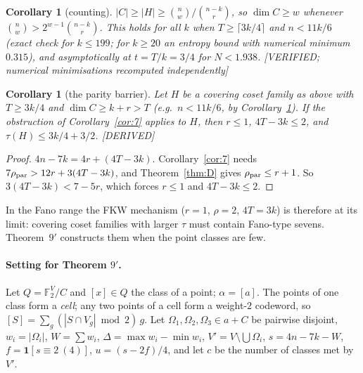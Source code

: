 \documentclass[11pt]{article}
\newtheorem{corollary}[theorem]{Corollary}
\theoremstyle{definition}
\newcommand{\st}[1]{\textsf{\small[#1]}}
\newcommand{\F}{\mathbb{F}_2}
\begin{document}
\begin{corollary}[counting]\label{cor:count}
$|C|\ge|H|\ge\binom nw/\binom{n-k}r$, so $\dim C\ge w$ whenever $\binom nw>2^{w-1}\binom{n-k}r$. This holds for all
$k$ when $T\ge\lceil3k/4\rceil$ and $n<11k/6$ (exact check for $k\le199$; for $k\ge20$ an entropy bound with numerical
minimum $0.315$), and asymptotically at $t=T/k=3/4$ for $N<1.938$. \st{VERIFIED; numerical minimisations recomputed
independently}
\end{corollary}



\begin{corollary}[the parity barrier]\label{cor:barrier}
Let $H$ be a covering coset family as above with $T\ge3k/4$ and $\dim C\ge k+r>T$ (e.g.\ $n<11k/6$, by
Corollary~\ref{cor:count}). If the obstruction of Corollary~\ref{cor:7} applies to $H$, then $r\le1$, $4T-3k\le2$, and
$\tau(H)\le3k/4+3/2$. \st{DERIVED}
\end{corollary}
\begin{proof}
$4n-7k=4r+(4T-3k)$. Corollary~\ref{cor:7} needs $7\rho_{\rm par}>12r+3(4T-3k)$, and Theorem~\ref{thm:D} gives
$\rho_{\rm par}\le r+1$. So $3(4T-3k)<7-5r$, which forces $r\le1$ and $4T-3k\le2$.
\end{proof}
In the Fano range the FKW mechanism ($r=1$, $\rho=2$, $4T=3k$) is therefore at its limit: covering coset families
with larger $\tau$ must contain Fano-type sevens. Theorem~$9'$ constructs them when the point classes are few.

\paragraph{Setting for Theorem $9'$.} Let $Q=\F^V/C$ and $[x]\in Q$ the class of a point; $\alpha=[a]$. The points of
one class form a \emph{cell}; any two points of a cell form a weight-$2$ codeword, so $[S]=\sum_g(|S\cap V_g|\bmod2)\,g$.
Let $\Omega_1,\Omega_2,\Omega_3\in a+C$ be pairwise disjoint, $w_i=|\Omega_i|$, $W=\sum w_i$, $\Delta=\max w_i-\min w_i$,
$V'=V\setminus\bigcup\Omega_i$, $s=4n-7k-W$, $f=\mathbf 1[s\equiv2\ (4)]$, $u=(s-2f)/4$, and let $c$ be the number of
classes met by $V'$.
\end{document}
